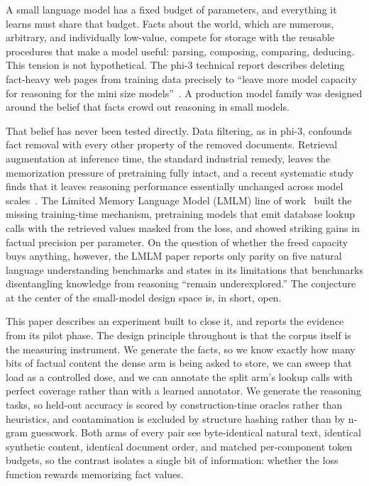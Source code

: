 \documentclass[11pt]{article}
\begin{document}
A small language model has a fixed budget of parameters, and everything it
learns must share that budget. Facts about the world, which are numerous,
arbitrary, and individually low-value, compete for storage with the
reusable procedures that make a model useful: parsing, composing,
comparing, deducing. This tension is not hypothetical. The phi-3 technical
report describes deleting fact-heavy web pages from training data
precisely to ``leave more model capacity for reasoning for the mini size
models''~\cite{phi3}. A production model family was designed around the
belief that facts crowd out reasoning in small models.

That belief has never been tested directly. Data filtering, as in phi-3,
confounds fact removal with every other property of the removed documents.
Retrieval augmentation at inference time, the standard industrial remedy,
leaves the memorization pressure of pretraining fully intact, and a recent
systematic study finds that it leaves reasoning performance essentially
unchanged across model scales~\cite{memorize}. The Limited Memory Language
Model (LMLM) line of work~\cite{lmlm} built the missing training-time
mechanism, pretraining models that emit database lookup calls with the
retrieved values masked from the loss, and showed striking gains in
factual precision per parameter. On the question of whether the freed
capacity buys anything, however, the LMLM paper reports only parity on
five natural language understanding benchmarks and states in its
limitations that benchmarks disentangling knowledge from reasoning
``remain underexplored.'' The conjecture at the center of the small-model
design space is, in short, open.

This paper describes an experiment built to close it, and reports the
evidence from its pilot phase. The design principle throughout is that the
corpus itself is the measuring instrument. We generate the facts, so we
know exactly how many bits of factual content the dense arm is being asked
to store, we can sweep that load as a controlled dose, and we can annotate
the split arm's lookup calls with perfect coverage rather than with a
learned annotator. We generate the reasoning tasks, so held-out accuracy
is scored by construction-time oracles rather than heuristics, and
contamination is excluded by structure hashing rather than by n-gram
guesswork. Both arms of every pair see byte-identical natural text,
identical synthetic content, identical document order, and matched
per-component token budgets, so the contrast isolates a single bit of
information: whether the loss function rewards memorizing fact values.
\end{document}
